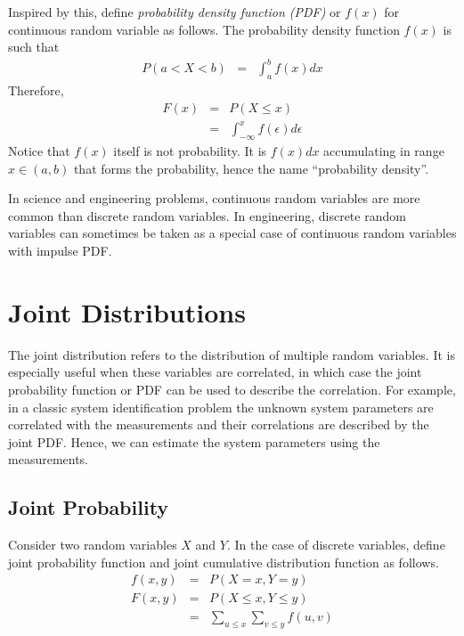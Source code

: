 Inspired by this, define \textit{probability density function (PDF)} or $f(x)$ for continuous random variable as follows. The probability density function $f(x)$ is such that
\begin{eqnarray}
  P(a < X < b) &=& \int_{a}^{b}f(x)dx \nonumber
\end{eqnarray}
Therefore,
\begin{eqnarray}
  F(x) &=& P(X\leq x) \nonumber \\
  &=& \int_{-\infty}^{x} f(\epsilon)d\epsilon \nonumber
\end{eqnarray}
Notice that $f(x)$ itself is not probability. It is $f(x)dx$ accumulating in range $x \in (a, b)$ that forms the probability, hence the name ``probability density''.

In science and engineering problems, continuous random variables are more common than discrete random variables. In engineering, discrete random variables can sometimes be taken as a special case of continuous random variables with impulse PDF.

\section{Joint Distributions}

The joint distribution refers to the distribution of multiple random variables. It is especially useful when these variables are correlated, in which case the joint probability function or PDF can be used to describe the correlation. For example, in a classic system identification problem the unknown system parameters are correlated with the measurements and their correlations are described by the joint PDF. Hence, we can estimate the system parameters using the measurements.

\subsection{Joint Probability}

Consider two random variables $X$ and $Y$. In the case of discrete variables, define joint probability function and joint cumulative distribution function as follows.
\begin{eqnarray}
  f(x, y) &=& P\left(X=x, Y=y\right) \nonumber \\
  F(x, y) &=& P\left(X\leq x, Y\leq y\right) \nonumber \\
  &=& \sum_{u\leq x}\sum_{v\leq y}f(u, v) \nonumber
\end{eqnarray}

